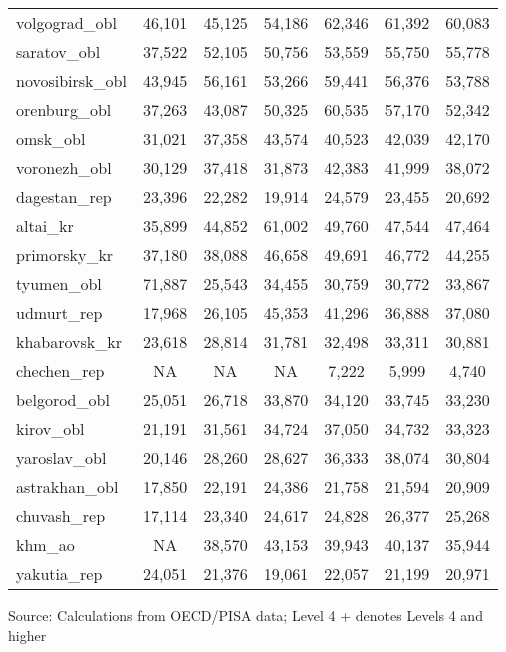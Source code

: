 \documentclass[alpha-refs,fleqn]{wiley-article_p2}
\begin{document}
\begin{table}[h]
\begin{threeparttable}
\begin{tabular}{p{5.5cm}cccccc}
volgograd\_obl	&	46,101	&	45,125	&	54,186	&	62,346	&	61,392	&	60,083	\\
saratov\_obl	&	37,522	&	52,105	&	50,756	&	53,559	&	55,750	&	55,778	\\
novosibirsk\_obl	&	43,945	&	56,161	&	53,266	&	59,441	&	56,376	&	53,788	\\
orenburg\_obl	&	37,263	&	43,087	&	50,325	&	60,535	&	57,170	&	52,342	\\
omsk\_obl	&	31,021	&	37,358	&	43,574	&	40,523	&	42,039	&	42,170	\\
voronezh\_obl	&	30,129	&	37,418	&	31,873	&	42,383	&	41,999	&	38,072	\\
dagestan\_rep	&	23,396	&	22,282	&	19,914	&	24,579	&	23,455	&	20,692	\\
altai\_kr	&	35,899	&	44,852	&	61,002	&	49,760	&	47,544	&	47,464	\\
primorsky\_kr	&	37,180	&	38,088	&	46,658	&	49,691	&	46,772	&	44,255	\\
tyumen\_obl	&	71,887	&	25,543	&	34,455	&	30,759	&	30,772	&	33,867	\\
udmurt\_rep	&	17,968	&	26,105	&	45,353	&	41,296	&	36,888	&	37,080	\\
khabarovsk\_kr	&	23,618	&	28,814	&	31,781	&	32,498	&	33,311	&	30,881	\\
chechen\_rep	&	NA	&	NA	&	NA	&	7,222	&	5,999	&	4,740	\\
belgorod\_obl	&	25,051	&	26,718	&	33,870	&	34,120	&	33,745	&	33,230	\\
kirov\_obl	&	21,191	&	31,561	&	34,724	&	37,050	&	34,732	&	33,323	\\
yaroslav\_obl	&	20,146	&	28,260	&	28,627	&	36,333	&	38,074	&	30,804	\\
astrakhan\_obl	&	17,850	&	22,191	&	24,386	&	21,758	&	21,594	&	20,909	\\
chuvash\_rep	&	17,114	&	23,340	&	24,617	&	24,828	&	26,377	&	25,268	\\
khm\_ao	&	NA	&	38,570	&	43,153	&	39,943	&	40,137	&	35,944	\\
yakutia\_rep	&	24,051	&	21,376	&	19,061	&	22,057	&	21,199	&	20,971	\\
\hline  %
\end{tabular}
\begin{tablenotes}
\item Source: Calculations from OECD/PISA data; Level 4 + denotes Levels 4 and higher
\end{tablenotes}
\end{threeparttable}
\end{table}
\end{document}
